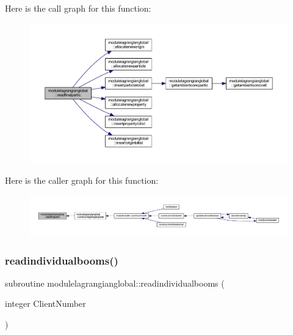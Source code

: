 Here is the call graph for this function\+:\nopagebreak
\begin{figure}[H]
\begin{center}
\leavevmode
\includegraphics[width=350pt]{namespacemodulelagrangianglobal_a101ffba4c1f5b064fc15cf4cd92df60e_cgraph}
\end{center}
\end{figure}
Here is the caller graph for this function\+:\nopagebreak
\begin{figure}[H]
\begin{center}
\leavevmode
\includegraphics[width=350pt]{namespacemodulelagrangianglobal_a101ffba4c1f5b064fc15cf4cd92df60e_icgraph}
\end{center}
\end{figure}
\mbox{\label{namespacemodulelagrangianglobal_ac534055f33c12be80f6b5d331e9cca95}} 
\subsubsection{\texorpdfstring{readindividualbooms()}{readindividualbooms()}}
{\footnotesize\ttfamily subroutine modulelagrangianglobal\+::readindividualbooms (\begin{DoxyParamCaption}\item[{integer}]{Client\+Number }\end{DoxyParamCaption})\hspace{0.3cm}{\ttfamily [private]}}

